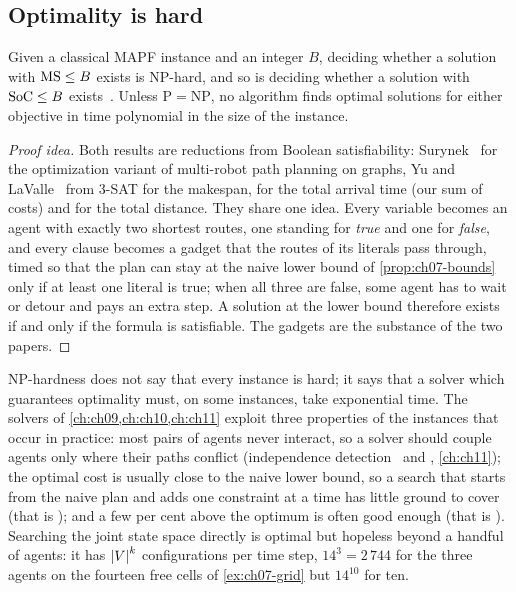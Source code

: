 \subsection{Optimality is hard}

\begin{theorem}
\label{thm:ch07-nphard}
Given a classical MAPF instance and an integer $B$, deciding whether a
solution with $\mathrm{MS} \le B$ exists is NP-hard, and so is deciding whether
a solution with $\mathrm{SoC} \le B$
exists~\cite{surynek2010optimization,yu2013structure}. Unless
$\mathrm{P} = \mathrm{NP}$, no algorithm finds optimal solutions for either
objective in time polynomial in the size of the
instance.
\end{theorem}
\begin{proof}[Proof idea]
Both results are reductions from Boolean satisfiability:
Surynek~\cite{surynek2010optimization} for the optimization variant of
multi-robot path planning on graphs, Yu and LaValle~\cite{yu2013structure}
from 3-SAT for the makespan, for the total arrival time (our sum of costs)
and for the total distance. They share one idea. Every variable becomes an
agent with exactly two shortest routes, one standing for \emph{true} and one
for \emph{false}, and every clause becomes a gadget that the routes of its
literals pass through, timed so that the plan can stay at the naive lower
bound of \cref{prop:ch07-bounds} only if at least one literal is true; when
all three are false, some agent has to wait or detour and pays an extra step.
A solution at the lower bound therefore exists if and only if the formula is
satisfiable. The gadgets are the substance of the two papers.
\end{proof}

NP-hardness does not say that every instance is hard; it says that a solver
which guarantees optimality must, on some instances, take exponential time.
The solvers of \cref{ch:ch09,ch:ch10,ch:ch11} exploit three properties of the
instances that occur in practice: most pairs of agents never interact, so a
solver should couple agents only where their paths conflict (independence
detection~\cite{standley2010finding} and \mstar, \cref{ch:ch11}); the optimal
cost is usually close to the naive lower bound, so a search that starts from
the naive plan and adds one constraint at a time has little ground to cover
(that is \cbs); and a few per cent above the optimum is often good enough
(that is \ecbs). Searching the joint state space directly is optimal but
hopeless beyond a handful of agents: it has $\left\lvert V \right\rvert^k$ configurations per
time step, $14^3 = 2\,744$ for the three agents on the fourteen free cells of
\cref{ex:ch07-grid} but $14^{10}$ for ten.

